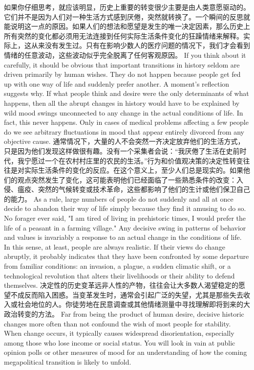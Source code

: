 \begin{paracol}{2}
\switchcolumn*
如果你仔细思考，就应该明显，历史上重要的转变很少主要是由人类意愿驱动的。它们并不是因为人们对一种生活方式感到厌倦，突然就转换了。一个瞬间的反思就能说明这一点的原因。如果人们的想法和愿望是发生的唯一决定因素，那么历史上所有突然的变化都必须用无法连接到任何实际生活条件变化的狂躁情绪来解释。实际上，这从来没有发生过。只有在影响少数人的医疗问题的情况下，我们才会看到情绪的任意波动，这些波动似乎完全脱离了任何客观原因。
\switchcolumn
If you think about it carefully, it should be obvious that important transitions in history seldom are driven primarily by human wishes. They do not happen because people get fed up with one way of life and suddenly prefer another. A moment's reflection suggests why. If what people think and desire were the only determinants of what happens, then all the abrupt changes in history would have to be explained by wild mood swings unconnected to any change in the actual conditions of life. In fact, this never happens. Only in cases of medical problems affecting a few people do we see arbitrary fluctuations in mood that appear entirely divorced from any objective cause.
\switchcolumn*
通常情况下，大量的人不会突然一齐决定放弃他们的生活方式，只是因为他们发现这样做很有趣。没有一个采集者会说：“我厌倦了生活在史前时代，我宁愿过一个在农村村庄里的农民的生活。”行为和价值观决策的决定性转变往往是对实际生活条件的变化的反应。在这个意义上，至少人们总是现实的。如果他们的观点突然发生了变化，这可能表明他们已经面临了一些熟悉条件的改变：入侵、瘟疫、突然的气候转变或技术革命，这些都影响了他们的生计或他们保卫自己的能力。
\switchcolumn
As a rule, large numbers of people do not suddenly and all at once decide to abandon their way of life simply because they find it amusing to do so. No forager ever said, "I am tired of living in prehistoric times, I would prefer the life of a peasant in a farming village." Any decisive swing in patterns of behavior and values is invariably a response to an actual change in the conditions of life. In this sense, at least, people are always realistic. If their views do change abruptly, it probably indicates that they have been confronted by some departure from familiar conditions: an invasion, a plague, a sudden climatic shift, or a technological revolution that alters their livelihoods or their ability to defend themselves.
\switchcolumn*
决定性的历史变革远非人性的产物，往往会让大多数人渴望稳定的愿望不成反而陷入困惑。当变革发生时，通常会引起广泛的失望，尤其是那些失去收入或社会地位的人。你徒劳地在民意调查或其他情绪测量中寻找理解即将到来的大政治转变的方法。
\switchcolumn
Far from being the product of human desire, decisive historic changes more often than not confound the wish of most people for stability. When change occurs, it typically causes widespread disorientation, especially among those who lose income or social status. You will look in vain at public opinion polls or other measures of mood for an understanding of how the coming megapolitical transition is likely to unfold.
\end{paracol}

